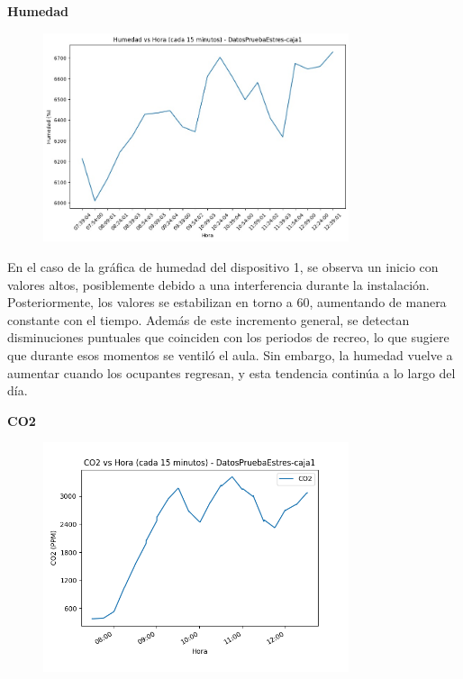 \documentclass{templateNote}
\begin{document}
\newpage
\textbf{Humedad}
\begin{figure}[H]
    \centering
    \includegraphics[width=0.8\textwidth]{img/DatosPruebaEstres-caja1_humedad_vs_hora_15min.jpg}
\end{figure}

\begin{tcolorbox}
    En el caso de la gráfica de humedad del dispositivo 1, se observa un inicio con valores altos, posiblemente debido a una interferencia durante la instalación. Posteriormente, los valores se estabilizan en torno a 60, aumentando de manera constante con el tiempo. Además de este incremento general, se detectan disminuciones puntuales que coinciden con los periodos de recreo, lo que sugiere que durante esos momentos se ventiló el aula. Sin embargo, la humedad vuelve a aumentar cuando los ocupantes regresan, y esta tendencia continúa a lo largo del día.
\end{tcolorbox}

\newpage
\textbf{CO2}
\begin{figure}[H]
    \centering
    \includegraphics[width=0.8\textwidth]{img/DatosPruebaEstres-caja1_co2_vs_hora_15min.png}
\end{figure}
\end{document}
